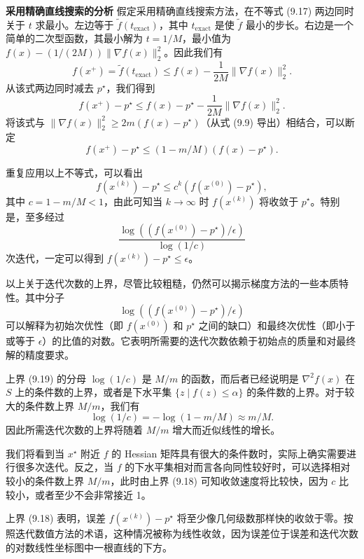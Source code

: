 \documentclass[UTF8,12pt,a4paper,fontset=fandol]{ctexart}
\begin{document}
\noindent\textbf{采用精确直线搜索的分析}\quad
假定采用精确直线搜索方法，在不等式 (9.17) 两边同时关于 $t$ 求最小。左边等于 $\tilde{f}(t_{\mathrm{exact}})$，其中 $t_{\mathrm{exact}}$ 是使 $\tilde{f}$ 最小的步长。右边是一个简单的二次型函数，其最小解为 $t=1/M$，最小值为 $f(x)-(1/(2M))\|\nabla f(x)\|_2^2$。因此我们有
\[
f(x^+)=\tilde{f}(t_{\mathrm{exact}})\leq f(x)-\frac{1}{2M}\|\nabla f(x)\|_2^2.
\]
从该式两边同时减去 $p^\star$，我们得到
\[
f(x^+)-p^\star\leq f(x)-p^\star-\frac{1}{2M}\|\nabla f(x)\|_2^2.
\]
将该式与 $\|\nabla f(x)\|_2^2\geq 2m(f(x)-p^\star)$（从式 (9.9) 导出）相结合，可以断定
\[
f(x^+)-p^\star\leq (1-m/M)(f(x)-p^\star).
\]

重复应用以上不等式，可以看出
\begin{equation}
f(x^{(k)})-p^\star\leq c^k(f(x^{(0)})-p^\star),
\tag{9.18}
\end{equation}
其中 $c=1-m/M<1$，由此可知当 $k\to\infty$ 时 $f(x^{(k)})$ 将收敛于 $p^\star$。特别是，至多经过
\begin{equation}
\frac{\log((f(x^{(0)})-p^\star)/\epsilon)}{\log(1/c)}
\tag{9.19}
\end{equation}
次迭代，一定可以得到 $f(x^{(k)})-p^\star\leq\epsilon$。

以上关于迭代次数的上界，尽管比较粗糙，仍然可以揭示梯度方法的一些本质特性。其中分子
\[
\log((f(x^{(0)})-p^\star)/\epsilon)
\]
可以解释为初始次优性（即 $f(x^{(0)})$ 和 $p^\star$ 之间的缺口）和最终次优性（即小于或等于 $\epsilon$）的比值的对数。它表明所需要的迭代次数依赖于初始点的质量和对最终解的精度要求。

上界 (9.19) 的分母 $\log(1/c)$ 是 $M/m$ 的函数，而后者已经说明是 $\nabla^2 f(x)$ 在 $S$ 上的条件数的上界，或者是下水平集 $\{z\mid f(z)\leq\alpha\}$ 的条件数的上界。对于较大的条件数上界 $M/m$，我们有
\[
\log(1/c)=-\log(1-m/M)\approx m/M.
\]
因此所需迭代次数的上界将随着 $M/m$ 增大而近似线性的增长。

我们将看到当 $x^\star$ 附近 $f$ 的 Hessian 矩阵具有很大的条件数时，实际上确实需要进行很多次迭代。反之，当 $f$ 的下水平集相对而言各向同性较好时，可以选择相对较小的条件数上界 $M/m$，此时由上界 (9.18) 可知收敛速度将比较快，因为 $c$ 比较小，或者至少不会非常接近 1。

上界 (9.18) 表明，误差 $f(x^{(k)})-p^\star$ 将至少像几何级数那样快的收敛于零。按照迭代数值方法的术语，这种情况被称为线性收敛，因为误差位于误差和迭代次数的对数线性坐标图中一根直线的下方。
\end{document}

